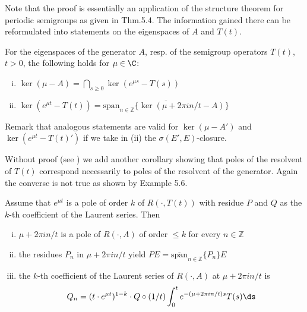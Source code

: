 Note that the proof is essentially an application of the structure theorem for periodic semigroups as given in Thm.5.4.
The information gained there can be reformulated into statements on the eigenspaces of $A$ and $T(t)$.



\begin{corollary}\label{cor:a3-6.4}
For the eigenspaces of the generator $A$, resp. of the semigroup operators $T(t)$, $t > 0$, the following holds  for  $\mu \in \C$:

\begin{enumerate}[(i)]
\item 
$\ker(\mu - A) = \bigcap_{s \geq 0} \ker(e^{\mu s} - T(s))$

\item 
$\ker(e^{\mu t} - T(t)) = \overline{\mathrm{span}_{n \in \mathbb{Z}} \{\ker(\mu + 2\pi i n/t - A)\}}$

\end{enumerate}
\end{corollary}

Remark that analogous statements are valid for $\ker(\mu - A')$ and $\ker(e^{\mu t} - T(t)')$ if we take in (ii) the $\sigma(E',E)$-closure.

Without proof (see \citet[Prop.I.10]{greiner:1981}) we add another corollary showing that poles of the resolvent of $T(t)$ correspond necessarily to poles of the resolvent of the generator.
Again the converse is not true as shown by Example 5.6.

\begin{corollary}\label{cor:a3-6.5}
Assume that $e^{\mu t}$ is a pole of order $k$ of $R(\cdot,T(t))$ with residue $P$ and $Q$ as the $k$-th coefficient of the Laurent series.
Then

\begin{enumerate}[(i)]
\item 
$\mu + 2\pi i n/t$ is a pole of $R(\cdot,A)$ of order $\leq k$ for every $n \in \mathbb{Z}$

\item 
the residues $P_{n}$ in $\mu + 2\pi i n/t$ yield $PE = \overline{\text{span}}_{n \in \mathbb{Z}} \{P_{n}\}E$

\item 
the $k$-th coefficient of the Laurent series of $R(\cdot,A)$ at $\mu + 2\pi i n/t$ is
\[
Q_{n} = (t \cdot e^{\mu t})^{1-k} \cdot Q \circ (1/t) \int_{0}^{t} e^{-(\mu+2\pi i n/t)s}T(s) \ds
\]
\end{enumerate}
\end{corollary}

